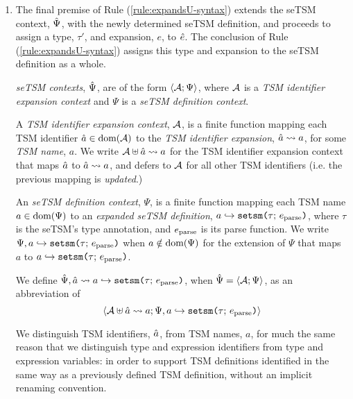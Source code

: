 \begin{enumerate}
\item The final premise of Rule (\ref{rule:expandsU-syntax}) extends the seTSM context, $\hat{\Psi}$, with the newly determined {seTSM definition}, and proceeds to assign a type, $\tau'$, and expansion, $e$, to ${\hat e}$. The conclusion of Rule (\ref{rule:expandsU-syntax}) assigns this type and expansion to the seTSM definition as a whole.%



\emph{seTSM contexts}, $\hat{\Psi}$, are of the form $\langle \mathcal{A}; \Psi \rangle$, where $\mathcal{A}$ is a \emph{TSM identifier expansion context} and $\Psi$ is a \emph{seTSM definition context}. 

A \emph{TSM identifier expansion context}, $\mathcal{A}$, is a finite function mapping each TSM identifier $\hat{a} \in \text{dom}(\mathcal{A})$ to the \emph{TSM identifier expansion}, $\hat{a} \leadsto a$, for some \emph{TSM name}, $a$. We write $\mathcal{A} \uplus \hat{a} \leadsto a$ for the TSM identifier expansion context that maps $\hat{a}$ to $\hat{a} \leadsto a$, and defers to $\mathcal{A}$ for all other TSM identifiers (i.e. the previous mapping is \emph{updated}.)

An \emph{seTSM definition context}, $\Psi$, is a finite function mapping each TSM name $a \in \text{dom}(\Psi)$ to an \emph{expanded seTSM definition}, $a \hookrightarrow \texttt{setsm}\texttt{(}\tau;\,e_\text{parse}\texttt{)}$, where $\tau$ is the seTSM's type annotation, and $e_\text{parse}$ is its parse function. We write $\Psi, a \hookrightarrow \texttt{setsm}\texttt{(}\tau;\,e_\text{parse}\texttt{)}$ when $a \notin \text{dom}(\Psi)$ for the extension of $\Psi$ that maps $a$ to $a \hookrightarrow \texttt{setsm}\texttt{(}\tau;\,e_\text{parse}\texttt{)}$. %

We define $\hat{\Psi}, \hat{a} \leadsto a \hookrightarrow \texttt{setsm}\texttt{(}\tau;\,e_\text{parse}\texttt{)}$, when $\hat{\Psi}=\langle \mathcal{A}; \Psi \rangle$, as an abbreviation of \[\langle \mathcal{A} \uplus \hat{a} \leadsto a; \Psi, a \hookrightarrow \texttt{setsm}\texttt{(}\tau;\,e_\text{parse}\texttt{)} \rangle\]

We distinguish TSM identifiers, $\hat{a}$, from TSM names, $a$, for much the same reason that we distinguish type and expression identifiers from type and expression variables: in order to support TSM definitions identified in the same way as a previously defined TSM definition, without an implicit renaming convention. %

\end{enumerate}


